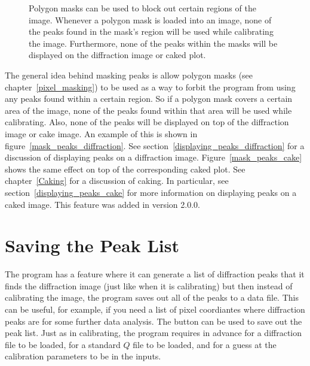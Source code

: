 \begin{figure}[htb]
    \caption{Polygon masks can be used to block
    out certain regions of the image. Whenever
    a polygon mask is loaded into an image, none
    of the peaks found in the mask's region will be
    used while calibrating the image. Furthermore,
    none of the peaks within the masks will be 
    displayed on the diffraction image or caked plot.}
    \label{mask_peaks}
\end{figure}

The general idea behind masking peaks is allow polygon 
masks (see chapter~\ref{pixel_masking}) to be used as 
a way to forbit the program from using any peaks found
within a certain region. So if a polygon mask covers a 
certain area of the image, none of the peaks found within that
area will be used while calibrating. Also, none of 
the peaks will be displayed on top of the diffraction 
image or cake image. An example of this is shown in
figure~\ref{mask_peaks_diffraction}. 
See section~\ref{displaying_peaks_diffraction}
for a discussion of displaying peaks on a diffraction
image.  Figure~\ref{mask_peaks_cake} shows the same effect 
on top of the corresponding caked plot. See 
chapter~\ref{Caking} for a discussion of caking.
In particular, see section~\ref{displaying_peaks_cake} 
for more information on displaying peaks on a caked
image. This feature was added in version 2.0.0.

\section{Saving the Peak List}

The program has a feature where it can generate
a list of diffraction peaks that it finds the 
diffraction image (just like when it is calibrating)
but then instead of calibrating the image, the program
saves out all of the peaks to a data file. This can
be useful, for example, if you need a list of pixel 
coordiantes where diffraction peaks are for some further
data analysis. The  button can
be used to save out the peak list. Just as in calibrating,
the program requires in advance for a diffraction file to
be loaded, for a standard $Q$ file to be loaded, and for
a guess at the calibration parameters to be in the inputs.

